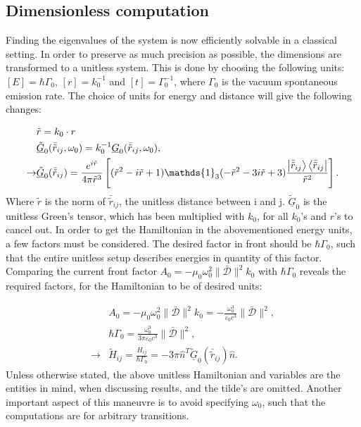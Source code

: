 \documentclass{article}
\begin{document}
\subsection{Dimensionless computation}\label{sec:dimless}

Finding the eigenvalues of the system is now efficiently solvable in a classical setting. In order to preserve as much precision as possible, the dimensions are transformed to a unitless system. This is done by choosing the following units: $[E]=\hbar \Gamma_0$, $[r] = k_0^{-1}$ and $[t] = \Gamma_0^{-1}$, where $\Gamma_0$ is the vacuum spontaneous emission rate. The choice of units for energy and distance will give the following changes: 

\begin{equation}\label{eq:Green_unitless}
    \begin{split}
        &\tilde{r} = k_0 \cdot r \\
        &\underline{\tilde{G}}_0(\bar{\tilde{r}}_{ij}, \omega_0) = k_0^{-1} \underline{G}_0(\bar{\tilde{r}}_{ij}, \omega_0), \\
        \rightarrow &\underline{\tilde{G}}_0(\bar{\tilde{r}}_{ij}) = \frac{e^{i\tilde{r}}}{4\pi \tilde{r}^3} \left[ (\tilde{r}^2 - i\tilde{r} + 1) \mathds{1}_3 (-\tilde{r}^2 - 3i\tilde{r} + 3) \frac{\ket{\bar{\tilde{r}}_{ij}}\bra{\bar{\tilde{r}}_{ij}}}{\tilde{r}^2} \right].
    \end{split}
\end{equation}
Where $\tilde{r}$ is the norm of $\bar{\tilde{r}}_{ij}$, the unitless distance between i and j. $\underline{\tilde{G}}_0$ is the unitless Green's tensor, which has been multiplied with $k_0$, for all $k_0$'s and $r$'s to cancel out. In order to get the Hamiltonian in the abovementioned energy units, a few factors must be considered. The desired factor in front should be $\hbar \Gamma_0$, such that the entire unitless setup describes energies in quantity of this factor. Comparing the current front factor $A_0 = -\mu_0 \omega_0^2 \|\bar{\mathscr{D}}\|^2 k_0$ with $\hbar \Gamma_0$ reveals the required factors, for the Hamiltonian to be of desired units:

\begin{equation}\label{eq:Hamiltonian_unitless}
    \begin{split}
        &A_0 = -\mu_0 \omega_0^2 \| \bar{\mathscr{D}} \|^2 k_0 = - \frac{\omega_0^3}{\varepsilon_0 c^3} \| \bar{\mathscr{D}} \|^2, \\
        &\hbar \Gamma_0 = \frac{\omega_0^3}{3\pi \varepsilon_0 c^3} \| \bar{\mathscr{D}} \|^2, \\
        \longrightarrow & \tilde{H}_{ij} = \frac{H_{ij}}{\hbar \Gamma_0} = -3 \pi \hat{n}^T \underline{\tilde{G}}_0 (\bar{\tilde{r}}_{ij}) \hat{n}.
    \end{split}
\end{equation}
Unless otherwise stated, the above unitless Hamiltonian and variables are the entities in mind, when discussing results, and the tilde's are omitted. Another important aspect of this maneuvre is to avoid specifying $\omega_0$, such that the computations are for arbitrary transitions.
\end{document}

